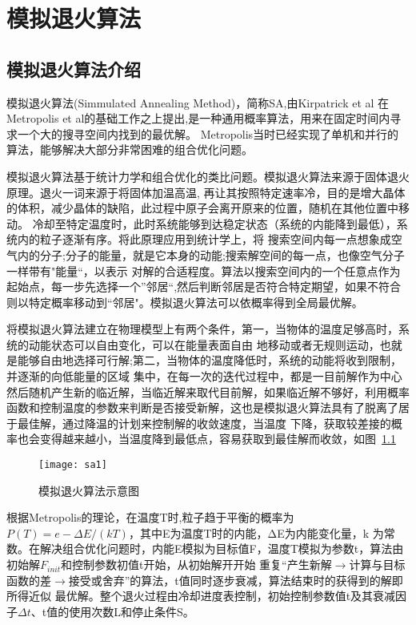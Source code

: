 
\chapter[模拟退火算法]{模拟退火算法}
\section{模拟退火算法介绍}
   模拟退火算法(Simmulated Annealing Method)，简称SA,由Kirpatrick et al\cite{obsa}
在Metropolis et al的基础工作之上提出,是一种通用概率算法，用来在固定时间内寻求一个大的搜寻空间内找到的最优解。
Metropolis当时已经实现了单机和并行的算法，能够解决大部分非常困难的组合优化问题。

    模拟退火算法基于统计力学和组合优化的类比问题。模拟退火算法来源于固体退火原理。退火一词来源于将固体加温高温,
再让其按照特定速率冷，目的是增大晶体的体积，减少晶体的缺陷，此过程中原子会离开原来的位置，随机在其他位置中移动。
冷却至特定温度时，此时系统能够到达稳定状态（系统的内能降到最低），系统内的粒子逐渐有序。将此原理应用到统计学上，将
搜索空间内每一点想象成空气内的分子;分子的能量，就是它本身的动能;搜索解空间的每一点，也像空气分子一样带有"能量“，以表示
对解的合适程度。算法以搜索空间内的一个任意点作为起始点，每一步先选择一个”邻居“,然后判断邻居是否符合特定期望，如果不符合
则以特定概率移动到“邻居"。模拟退火算法可以依概率得到全局最优解。

   将模拟退火算法建立在物理模型上有两个条件，第一，当物体的温度足够高时，系统的动能状态可以自由变化，可以在能量表面自由
地移动或者无规则运动，也就是能够自由地选择可行解;第二，当物体的温度降低时，系统的动能将收到限制，并逐渐的向低能量的区域
集中，在每一次的迭代过程中，都是一目前解作为中心然后随机产生新的临近解，当临近解来取代目前解，如果临近解不够好，利用概率
函数和控制温度的参数来判断是否接受新解，这也是模拟退火算法具有了脱离了居于最佳解，通过降温的计划来控制解的收敛速度，当温度
下降，获取较差接的概率也会变得越来越小，当温度降到最低点，容易获取到最佳解而收敛，如图~\ref{fig:sa1}

\begin{figure}[htbp]
\centering
\texttt{[image: sa1]}
\caption{模拟退火算法示意图}\label{fig:sa1}
\vspace{\baselineskip}
\end{figure}


   根据Metropolis的理论，在温度T时,粒子趋于平衡的概率为$P(T)=e-ΔE/(kT)$，其中E为温度T时的内能，ΔE为内能变化量，k
为常数。在解决组合优化问题时，内能E模拟为目标值F，温度T模拟为参数t，算法由初始解$F_{init}$和控制参数初值t开始，从初始解开开始
重复“产生新解$\rightarrow$计算与目标函数的差$\rightarrow$接受或舍弃”的算法，t值同时逐步衰减，算法结束时的获得到的解即所得近似
最优解。整个退火过程由冷却进度表控制，初始控制参数值t及其衰减因子$Δt$、t值的使用次数L和停止条件S\cite{Zhouping}。 

